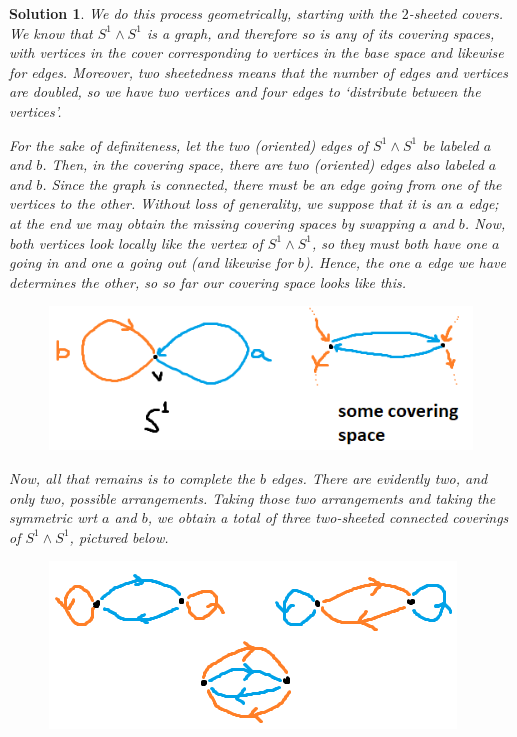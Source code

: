 \documentclass{article}
\theoremstyle{plain}
\theoremstyle{nonumberplain}
\newtheorem{sol}{Solution}
\begin{document}
\begin{sol}
We do this process geometrically, starting with the $2$-sheeted covers. We know that $S^1 \wedge S^1$ is a graph, and therefore so is any of its covering spaces, with vertices in the cover corresponding to vertices in the base space and likewise for edges. Moreover, two sheetedness means that the number of edges and vertices are doubled, so we have two vertices and four edges to `distribute between the vertices'.

For the sake of definiteness, let the two (oriented) edges of $S^1 \wedge S^1$ be labeled $a$ and $b$. Then, in the covering space, there are two (oriented) edges also labeled $a$ and $b$. Since the graph is connected, there must be an edge going from one of the vertices to the other. Without loss of generality, we suppose that it is an $a$ edge; at the end we may obtain the missing covering spaces by swapping $a$ and $b$. Now, both vertices look locally like the vertex of $S^1 \wedge S^1$, so they must both have one $a$ going in and one $a$ going out (and likewise for $b$). Hence, the one $a$ edge we have determines the other, so so far our covering space looks like this.
\begin{figure}[H]
\centering
\includegraphics{cov1}
\end{figure}

Now, all that remains is to complete the $b$ edges. There are evidently two, and only two, possible arrangements. Taking those two arrangements and taking the symmetric wrt $a$ and $b$, we obtain a total of three two-sheeted connected coverings of $S^1 \wedge S^1$, pictured below.
\begin{figure}[H]
\centering
\includegraphics{cov2}
\end{figure}


\end{sol}
\end{document}
